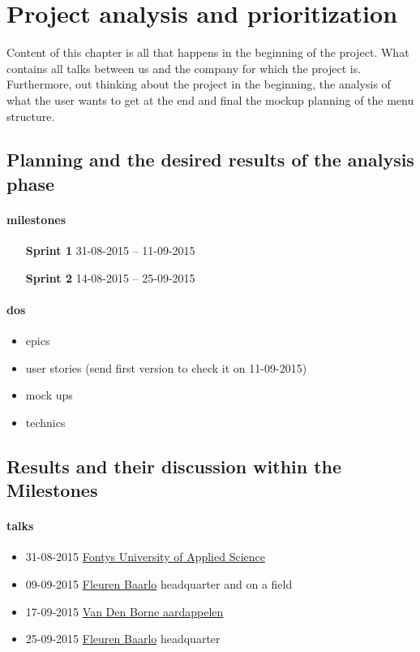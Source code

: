 \section{Project analysis and prioritization}
Content of this chapter is all that happens in the beginning of the project. What contains all talks between us and the company for which the project is. Furthermore, out thinking about the project in the beginning, the analysis of what the user wants to get at the end and final the mockup planning of the menu structure.

\subsection{Planning and the desired results of the analysis phase}




\paragraph{milestones}
\begin{itemize}
	\item[\textbf{Sprint 1}] 31-08-2015 -- 11-09-2015 
	\item[\textbf{Sprint 2}] 14-08-2015 -- 25-09-2015 
\end{itemize}

\paragraph{dos}
\begin{itemize}
	\item epics
	\item user stories (send first version to check it on 11-09-2015)
	\item mock ups
	\item technics
\end{itemize}

\subsection{Results and their discussion within the Milestones}

\paragraph{talks}
\begin{itemize}
	\item 31-08-2015 \href{http://fontys.nl}{Fontys University of Applied Science}
	\item 09-09-2015 \href{http://fleuren.net}{Fleuren Baarlo} headquarter and on a field
	\item 17-09-2015 \href{http://www.vandenborneaardappelen.com}{Van Den Borne aardappelen} 
	\item 25-09-2015 \href{http://fleuren.net}{Fleuren Baarlo} headquarter
\end{itemize}